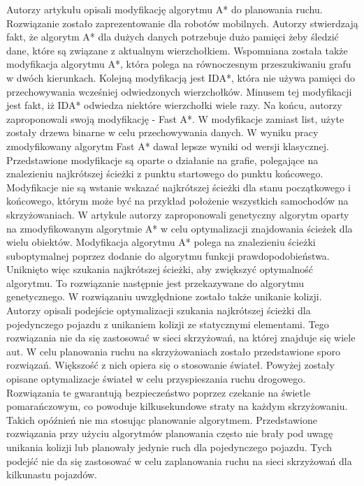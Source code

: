 \indent
Autorzy artykułu \cite{munteanmobile} opisali modyfikację algorytmu A* do planowania ruchu. Rozwiązanie zostało zaprezentowanie dla robotów mobilnych. Autorzy stwierdzają fakt, że algorytm A* dla dużych danych potrzebuje dużo pamięci żeby śledzić dane, które są związane z aktualnym wierzchołkiem. Wspomniana została także modyfikacja algorytmu A*, która polega na równoczesnym przeszukiwaniu grafu w dwóch kierunkach. Kolejną modyfikacją jest IDA*, która nie używa pamięci do przechowywania wcześniej odwiedzonych wierzchołków. Minusem tej modyfikacji jest fakt, iż IDA* odwiedza niektóre wierzchołki wiele razy. Na końcu, autorzy zaproponowali swoją modyfikację - Fast A*. W modyfikacje zamiast list, użyte zostały drzewa binarne w celu przechowywania danych. W wyniku pracy zmodyfikowany algorytm Fast A* dawał lepsze wyniki od wersji klasycznej. Przedstawione modyfikacje są oparte o działanie na grafie, polegające na znalezieniu najkrótszej ścieżki z punktu startowego do punktu końcowego. Modyfikacje nie są wstanie wskazać najkrótszej ścieżki dla stanu początkowego i końcowego, którym może być na przykład położenie wszystkich samochodów na skrzyżowaniach.
\newline
\indent
W artykule \cite{oleiwi2014modified} autorzy zaproponowali genetyczny algorytm oparty na zmodyfikowanym algorytmie A* w celu optymalizacji znajdowania ścieżek dla wielu obiektów. Modyfikacja algorytmu A* polega na znalezieniu ścieżki suboptymalnej poprzez dodanie do algorytmu funkcji prawdopodobieństwa. Uniknięto więc szukania najkrótszej ścieżki, aby zwiększyć optymalność algorytmu. To rozwiązanie następnie jest przekazywane do algorytmu genetycznego. W rozwiązaniu uwzględnione zostało także unikanie kolizji. Autorzy opisali podejście optymalizacji szukania najkrótszej ścieżki dla pojedynczego pojazdu z unikaniem kolizji ze statycznymi elementami. Tego rozwiązania nie da się zastosować w sieci skrzyżowań, na której znajduje się wiele aut.
\newline
\indent
W celu planowania ruchu na skrzyżowaniach zostało przedstawione sporo rozwiązań. Większość z nich opiera się o stosowanie świateł. Powyżej zostały opisane optymalizacje świateł w celu przyspieszania ruchu drogowego. Rozwiązania te gwarantują bezpieczeństwo poprzez czekanie na świetle pomarańczowym, co powoduje kilkusekundowe straty na każdym skrzyżowaniu. Takich opóźnień nie ma stosując planowanie algorytmem. Przedstawione rozwiązania przy użyciu algorytmów planowania często nie brały pod uwagę unikania kolizji lub planowały jedynie ruch dla pojedynczego pojazdu. Tych podejść nie da się zastosować w celu zaplanowania ruchu na sieci skrzyżowań dla kilkunastu pojazdów.
